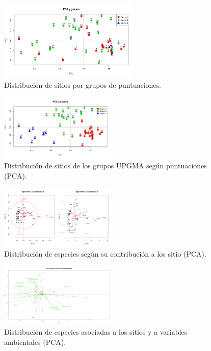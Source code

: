\documentclass[11pt,]{article}
\begin{document}
\begin{figure}
\centering
\includegraphics[width=0.60000\textwidth]{biplot upgma.png}
\caption{Distribución de sitios por grupos de
puntuaciones.\label{fig:upgmabip}}
\end{figure}

\begin{figure}
\centering
\includegraphics[width=0.50000\textwidth]{grafico de cluste PCA.png}
\caption{Distribución de sitios de los grupos UPGMA según puntuaciones
(PCA).\label{fig:puntuaciones}}
\end{figure}

\begin{figure}
\centering
\includegraphics[width=0.50000\textwidth]{pca com amb.png}
\caption{Distribución de especies según su contribución a los sitio
(PCA).\label{fig:paccont}}
\end{figure}

\begin{figure}
\centering
\includegraphics[width=0.50000\textwidth]{amb_spec_esc.png}
\caption{Distribución de especies asociadas a los sitios y a variables
ambientales (PCA).\label{fig:amb_esp_esc}}
\end{figure}
\end{document}
